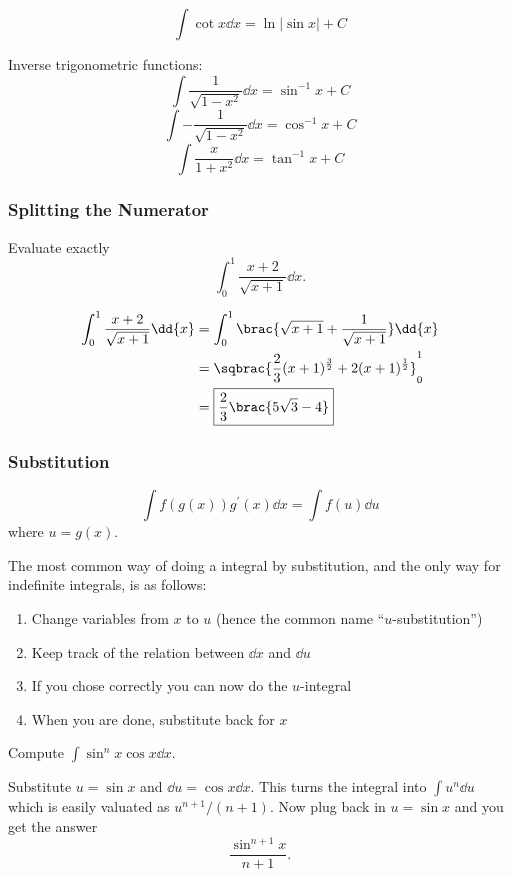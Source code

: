 \[ \int \cot x \dd{x} = \ln|\sin x| + C \]

Inverse trigonometric functions:
\[ \int\frac{1}{\sqrt{1-x^2}}\dd{x} = \sin^{-1}x + C \]
\[ \int-\frac{1}{\sqrt{1-x^2}}\dd{x} = \cos^{-1}x + C \]
\[ \int\frac{x}{1+x^2}\dd{x} = \tan^{-1}x + C \]

\subsubsection{Splitting the Numerator}
\begin{exercise}
Evaluate exactly
\[ \int_0^1\frac{x+2}{\sqrt{x+1}}\dd{x}. \]
\end{exercise}
\begin{solution}
\begin{align*}
\int_0^1\frac{x+2}{\sqrt{x+1}}\dd{x}
&= \int_0^1\brac{\sqrt{x+1}+\frac{1}{\sqrt{x+1}}}\dd{x} \\
&= \sqbrac{\frac{2}{3}(x+1)^\frac{3}{2}+2(x+1)^\frac{1}{2}}_0^1 \\
&= \boxed{\frac{2}{3}\brac{5\sqrt{3}-4}}
\end{align*}
\end{solution}

\subsubsection{Substitution}
\begin{equation}
\int f(g(x)) g^\prime (x)\dd{x} = \int f(u) \dd{u}
\end{equation}
where $u=g(x)$.

The most common way of doing a integral by substitution, and the only way for indefinite integrals, is as follows:
\begin{enumerate}
\item Change variables from $x$ to $u$ (hence the common name ``$u$-substitution'')
\item Keep track of the relation between $\dd{x}$ and $\dd{u}$
\item If you chose correctly you can now do the $u$-integral
\item When you are done, substitute back for $x$
\end{enumerate}

\begin{exercise}
Compute $\int\sin^nx\cos x\dd{x}$.
\end{exercise}
\begin{solution}
Substitute $u = \sin x$ and $\dd{u} = \cos x\dd{x}$. This turns the integral into $\int u^n\dd{u}$ which is easily valuated as $u^{n+1}/(n+1)$. Now plug back in $u = \sin x$ and you get the answer
\[ \frac{\sin^{n+1}x}{n+1}. \]
\end{solution}

